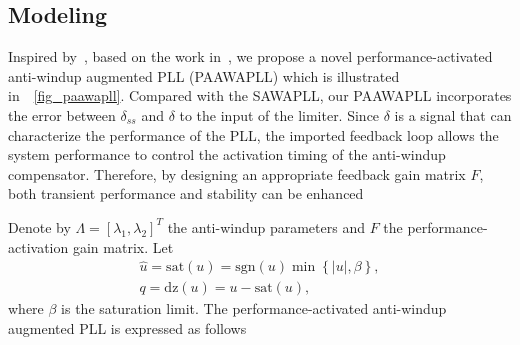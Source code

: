 \documentclass[10pt,final,journal,twoside]{IEEEtran}
\begin{document}
\subsection{Modeling}\label{subsec:paawapllm}
Inspired by~\cite{tang2023,chen2023}, based on the work in~\cite{lai2024}, we propose a novel performance-activated anti-windup augmented PLL (PAAWAPLL) which is illustrated in~\figurename~\ref{fig_paawapll}.
Compared with the SAWAPLL, our PAAWAPLL incorporates the error between $\delta_{ss}$ and $\delta$ to the input of the limiter. Since $\delta$ is a signal that can characterize the performance of the PLL, the imported feedback loop allows the system
performance to control the activation timing of the anti-windup compensator. Therefore, by designing an appropriate feedback gain matrix $F$, both transient performance and stability can be enhanced\par
Denote by $\Lambda=[\lambda_1,\lambda_2]^T$ the anti-windup parameters and $F$ the performance-activation gain matrix. Let
\begin{gather*}\hat{u}=\textrm{sat}(u)=\textrm{sgn}(u)\min\left\{|u|,\beta\right\},\\
q=\textrm{dz}(u)=u-\textrm{sat}(u),\end{gather*}
where $\beta$ is the saturation limit. The performance-activated anti-windup augmented PLL is expressed as follows
\end{document}
